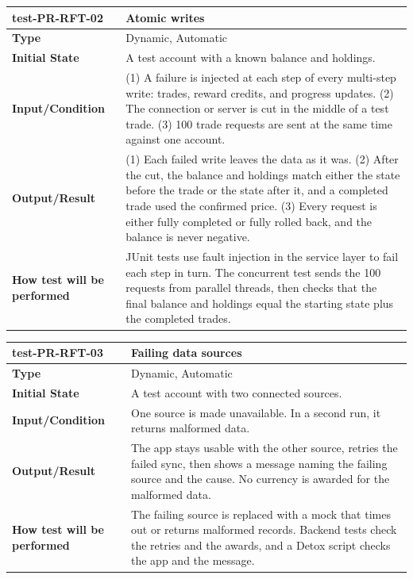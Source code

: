\documentclass[12pt, titlepage]{article}
\begin{document}
\vspace{1em}

\noindent\begin{tabularx}{\textwidth}{>{\raggedright\arraybackslash}p{3.5cm}X}
  \toprule
  \textbf{test-PR-RFT-02} & \textbf{Atomic writes}\\
  \midrule
  \textbf{Type} & Dynamic, Automatic\\
  \textbf{Initial State} & A test account with a known balance and holdings.\\
  \textbf{Input/Condition} & (1) A failure is injected at each step of every multi-step write: trades, reward credits, and progress updates. (2) The connection or server is cut in the middle of a test trade. (3) 100 trade requests are sent at the same time against one account.\\
  \textbf{Output/Result} & (1) Each failed write leaves the data as it was. (2) After the cut, the balance and holdings match either the state before the trade or the state after it, and a completed trade used the confirmed price. (3) Every request is either fully completed or fully rolled back, and the balance is never negative.\\
  \textbf{How test will be performed} & JUnit tests use fault injection in the service layer to fail each step in turn. The concurrent test sends the 100 requests from parallel threads, then checks that the final balance and holdings equal the starting state plus the completed trades.\\
  \bottomrule
\end{tabularx}

\vspace{1em}

\noindent\begin{tabularx}{\textwidth}{>{\raggedright\arraybackslash}p{3.5cm}X}
  \toprule
  \textbf{test-PR-RFT-03} & \textbf{Failing data sources}\\
  \midrule
  \textbf{Type} & Dynamic, Automatic\\
  \textbf{Initial State} & A test account with two connected sources.\\
  \textbf{Input/Condition} & One source is made unavailable. In a second run, it returns malformed data.\\
  \textbf{Output/Result} & The app stays usable with the other source, retries the failed sync, then shows a message naming the failing source and the cause. No currency is awarded for the malformed data.\\
  \textbf{How test will be performed} & The failing source is replaced with a mock that times out or returns malformed records. Backend tests check the retries and the awards, and a Detox script checks the app and the message.\\
  \bottomrule
\end{tabularx}
\end{document}

